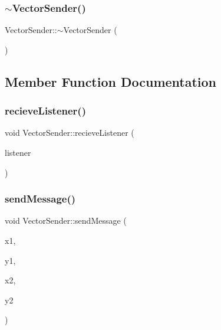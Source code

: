 \mbox{\label{class_vector_sender_accae2c766ad94d1ba98ef522c027594c}} 
\subsubsection{\texorpdfstring{$\sim$\+Vector\+Sender()}{~VectorSender()}}
{\footnotesize\ttfamily Vector\+Sender\+::$\sim$\+Vector\+Sender (\begin{DoxyParamCaption}{ }\end{DoxyParamCaption})}



\subsection{Member Function Documentation}
\mbox{\label{class_vector_sender_a3e198ee2de79b7ed6d5271630113a80c}} 
\subsubsection{\texorpdfstring{recieve\+Listener()}{recieveListener()}}
{\footnotesize\ttfamily void Vector\+Sender\+::recieve\+Listener (\begin{DoxyParamCaption}\item[{\hyperlink{class_vector_listener}{Vector\+Listener} $\ast$}]{listener }\end{DoxyParamCaption})}

\mbox{\label{class_vector_sender_a5a4f8b41c85f1e0637b647e4afd36eea}} 
\subsubsection{\texorpdfstring{send\+Message()}{sendMessage()}}
{\footnotesize\ttfamily void Vector\+Sender\+::send\+Message (\begin{DoxyParamCaption}\item[{float}]{x1,  }\item[{float}]{y1,  }\item[{float}]{x2,  }\item[{float}]{y2 }\end{DoxyParamCaption})}




